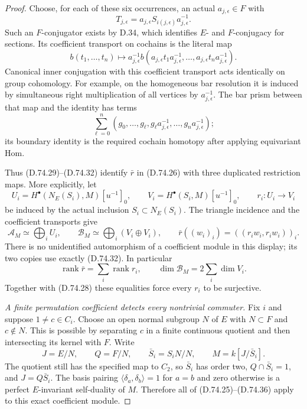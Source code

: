 \begin{proof}
Choose, for each of these six occurrences, an actual
$a_{j,\epsilon}\in F$ with
\[
 T_{j,\epsilon}=a_{j,\epsilon}S_{i(j,\epsilon)}
                                    a_{j,\epsilon}^{-1}.
 \tag{D.74.31}
\]
Such an $F$-conjugator exists by D.34, which identifies
$E$- and $F$-conjugacy for sections.  Its coefficient
transport on cochains is the literal map
\[
 b(t_1,\ldots,t_n)\longmapsto
 a_{j,\epsilon}^{-1}
 b(a_{j,\epsilon}t_1a_{j,\epsilon}^{-1},\ldots,
   a_{j,\epsilon}t_na_{j,\epsilon}^{-1}).
 \tag{D.74.32}
\]
Canonical inner conjugation with this coefficient
transport acts identically on group cohomology.
For example, on the homogeneous bar resolution it
is induced by simultaneous right multiplication
of all vertices by $a_{j,\epsilon}^{-1}$.
The bar prism between that map and the identity
has terms
\[
 \sum_{\ell=0}^{n}
 (g_0,\ldots,g_\ell,
   g_\ell a_{j,\epsilon}^{-1},\ldots,
   g_n a_{j,\epsilon}^{-1});
 \tag{D.74.33}
\]
its boundary identity is the required cochain
homotopy after applying equivariant Hom.

Thus (D.74.29)--(D.74.32) identify $\bar r$ in
(D.74.26) with three duplicated restriction maps.
More explicitly, let
\[
 U_i=H^\bullet(N_E(S_i),M)[u^{-1}]_0,\qquad
 V_i=H^\bullet(S_i,M)[u^{-1}]_0,\qquad
 r_i:U_i\longrightarrow V_i
 \tag{D.74.34}
\]
be induced by the actual inclusion $S_i\subset N_E(S_i)$.
The triangle incidence and the coefficient transports
give
\[
 \mathcal A_M\simeq\bigoplus_iU_i,\qquad
 \mathcal B_M\simeq\bigoplus_i(V_i\oplus V_i),
 \qquad
 \bar r((w_i)_i)=((r_iw_i,r_iw_i))_i .
 \tag{D.74.35}
\]
There is no unidentified automorphism of a coefficient
module in this display; its two copies use exactly
(D.74.32).  In particular
\[
 \operatorname{rank}\bar r=\sum_i\operatorname{rank}r_i,
 \qquad
 \dim\mathcal B_M=2\sum_i\dim V_i .
 \tag{D.74.36}
\]
Together with (D.74.28) these equalities force every
$r_i$ to be surjective.

\emph{A finite permutation coefficient detects every nontrivial commuter.}
Fix $i$ and suppose $1\ne c\in C_i$.
Choose an open normal subgroup $N$ of $E$ with
$N\subset F$ and $c\notin N$.  This is possible
by separating $c$ in a finite continuous quotient
and then intersecting its kernel with $F$.
Write
\[
 J=E/N,\qquad Q=F/N,\qquad \bar S_i=S_iN/N,\qquad
                    M=k[J/\bar S_i].
 \tag{D.74.37}
\]
The quotient still has the specified map to $C_2$,
so $\bar S_i$ has order two,
$Q\cap\bar S_i=1$, and $J=Q\bar S_i$.
The basis pairing
$\langle\delta_a,\delta_b\rangle=1$ for $a=b$
and zero otherwise is a perfect $E$-invariant
self-duality of $M$.  Therefore all of
(D.74.25)--(D.74.36) apply to this exact coefficient
module.


\end{proof}

